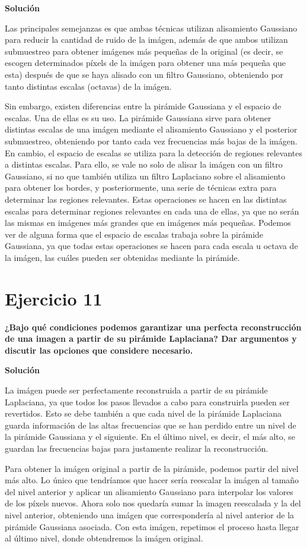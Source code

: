 \documentclass[11pt,a4paper]{article}
\newcommand{\answer}{\noindent\textbf{Solución}}
\newcommand{\question}[1]{\noindent\textbf{#1}}
\newcommand{\nonumbersection}[1]{\section*{#1}\addcontentsline{toc}{section}{#1}}
\begin{document}
\answer

Las principales semejanzas es que ambas técnicas utilizan alisamiento Gaussiano para reducir la cantidad
de ruido de la imágen, además de que ambos utilizan submuestreo para obtener imágenes más
pequeñas de la original (es decir, se escogen determinados píxels de la imágen para obtener una
más pequeña que esta) después de que se haya alisado con un filtro Gaussiano, obteniendo
por tanto distintas escalas (octavas) de la imágen.

Sin embargo, existen diferencias entre la pirámide Gaussiana y el espacio de escalas. Una de ellas es su uso.
La pirámide Gaussiana sirve para obtener distintas escalas de una imágen mediante
el alisamiento Gaussiano y el posterior submuestreo, obteniendo por tanto cada vez frecuencias más bajas de la imágen.
En cambio, el espacio de escalas se utiliza para la detección de regiones relevantes a distintas escalas. Para ello,
se vale no solo de alisar la imágen con un filtro Gaussiano, si no que también utiliza un filtro Laplaciano sobre el alisamiento
para obtener los bordes, y posteriormente, una serie de técnicas extra para determinar las regiones relevantes. Estas
operaciones se hacen en las distintas escalas para determinar regiones relevantes en cada una de ellas, ya que no serán las mismas
en imágenes más grandes que en imágenes más pequeñas. Podemos ver de alguna forma que el espacio de escalas trabaja sobre
la pirámide Gaussiana, ya que todas estas operaciones se hacen para cada escala u octava de la imágen, las cuáles pueden
ser obtenidas mediante la pirámide.


\nonumbersection{Ejercicio 11}

\question{¿Bajo qué condiciones podemos garantizar una perfecta reconstrucción
de una imagen a partir de su pirámide Laplaciana? Dar argumentos y
discutir las opciones que considere necesario.}

\answer

La imágen puede ser perfectamente reconstruida a partir de su pirámide Laplaciana, ya que todos
los pasos llevados a cabo para construirla pueden ser revertidos. Esto se debe también a que cada nivel de la pirámide
Laplaciana guarda información de las altas frecuencias que se han perdido entre un nivel de la pirámide Gaussiana y el siguiente.
En el último nivel, es decir, el más alto, se guardan las frecuencias bajas para justamente realizar la reconstrucción.

Para obtener la imágen original a partir de la pirámide, podemos partir del nivel más alto. Lo único que
tendríamos que hacer sería reescalar la imágen al tamaño del nivel anterior y aplicar un alisamiento Gaussiano para
interpolar los valores de los píxels nuevos. Ahora solo nos quedaría sumar la imagen reescalada y la del nivel anterior,
obteniendo una imágen que correspondería al nivel anterior de la pirámide Gaussiana asociada. Con esta imágen, repetimos
el proceso hasta llegar al último nivel, donde obtendremos la imágen original.
\end{document}
